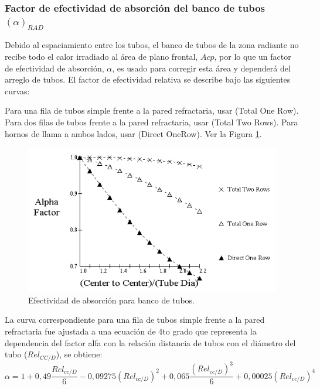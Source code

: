 \subsubsection{Factor de efectividad de absorción del banco de tubos $(\alpha)_{RAD}$}
\par Debido al espaciamiento entre los tubos, el banco de tubos de la zona radiante no recibe todo el calor irradiado al área de plano frontal, $Acp$, por lo que un factor de efectividad de absorción, $\alpha$, es usado para corregir esta área y dependerá del arreglo de tubos. El factor de efectividad relativa se describe bajo las siguientes curvas:
\par Para una fila de tubos simple frente a la pared refractaria, usar (Total One Row). Para dos filas de tubos frente a la pared refractaria, usar (Total Two Rows). Para hornos de llama a ambos lados, usar (Direct OneRow). Ver la Figura \ref{fig:alpha}.
\begin{figure}[H]
\begin{center}
\includegraphics[scale=0.45]{images/alpha}
\caption[Efectividad de absorción para banco de tubos]{Efectividad de absorción para banco de tubos.} 
\label{fig:alpha}
\end{center}
\end{figure}
\par La curva correspondiente para una fila de tubos simple frente a la pared refractaria fue ajustada a una ecuación de 4to grado que representa la dependencia del factor alfa con la relación distancia de tubos con el diámetro del tubo ($Rel_{CC/D}$), se obtiene:
\begin{equation}
    \alpha = 1 + 0,49\frac{Rel_{cc/D}}{6} -0,09275(Rel_{cc/D})^2 +
     0,065\frac{(Rel_{cc/D})^3}{6} + 0,00025(Rel_{cc/D})^4
\end{equation}

